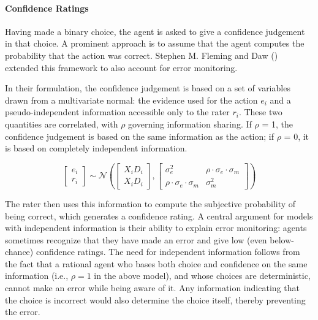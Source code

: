\documentclass[
]{article}
\begin{document}
\paragraph{Confidence Ratings}\label{confidence-ratings}

Having made a binary choice, the agent is asked to give a confidence
judgement in that choice. A prominent approach is to assume that the
agent computes the probability that the action was correct. Stephen M.
Fleming and Daw
()
extended this framework to also account for error monitoring.

In their formulation, the confidence judgement is based on a set of
variables drawn from a multivariate normal: the evidence used for the
action \(e_i\) and a pseudo-independent information accessible only to
the rater \(r_i\). These two quantities are correlated, with \(\rho\)
governing information sharing. If \(\rho\) = 1, the confidence judgement
is based on the same information as the action; if \(\rho\) = 0, it is
based on completely independent information.

\[
\begin{bmatrix}e_i \\ r_i\end{bmatrix}\sim \mathcal{N}\left(\begin{bmatrix}X_iD_i \\ X_iD_i\end{bmatrix},\begin{bmatrix}\sigma_e^2 & \rho \cdot \sigma_e \cdot \sigma_m \\ \rho \cdot \sigma_e \cdot \sigma_m & \sigma_m^2\end{bmatrix}\right)
\]

The rater then uses this information to compute the subjective
probability of being correct, which generates a confidence rating. A
central argument for models with independent information is their
ability to explain error monitoring: agents sometimes recognize that
they have made an error and give low (even below-chance) confidence
ratings. The need for independent information follows from the fact that
a rational agent who bases both choice and confidence on the same
information (i.e., \(\rho = 1\) in the above model), and whose choices
are deterministic, cannot make an error while being aware of it. Any
information indicating that the choice is incorrect would also determine
the choice itself, thereby preventing the error.
\end{document}
